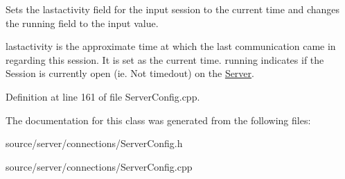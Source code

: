 Sets the lastactivity field for the input session to the current time and changes the running field to the input value. 

lastactivity is the approximate time at which the last communication came in regarding this session. It is set as the current time. running indicates if the Session is currently open (ie. Not timedout) on the \hyperlink{class_server}{Server}. 

Definition at line 161 of file Server\-Config.\-cpp.



The documentation for this class was generated from the following files\-:\begin{DoxyCompactItemize}
\item 
source/server/connections/Server\-Config.\-h\item 
source/server/connections/Server\-Config.\-cpp\end{DoxyCompactItemize}
